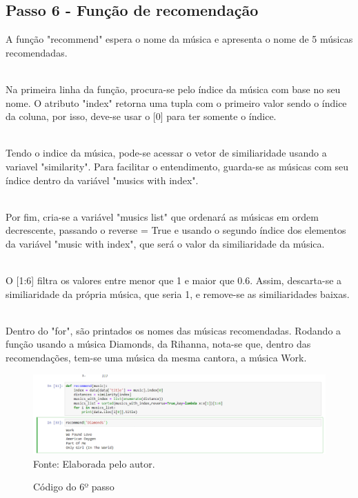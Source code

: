 \documentclass[a4paper, 12pt]{article}
\begin{document}
\subsection{Passo 6 - Função de recomendação}

A função "recommend" espera o nome da música e apresenta o nome de 5 músicas recomendadas.

\\Na primeira linha da função, procura-se pelo índice da música com base no seu nome. O atributo "index" retorna uma tupla com o primeiro valor sendo o índice da coluna, por isso, deve-se usar o [0] para ter somente o índice.

\\Tendo o indice da música, pode-se acessar o vetor de similiaridade usando a variavel "similarity". Para facilitar o entendimento,
guarda-se as músicas com seu índice dentro da variável "musics with index".

\\Por fim, cria-se a variável "musics list" que ordenará as músicas em ordem decrescente, passando o reverse = True e usando o segundo
índice dos elementos da variável "music with index", que será o valor da similiaridade da música.

\\O [1:6] filtra os valores entre menor que 1 e maior que 0.6. Assim, descarta-se a similiaridade da própria música, que seria 1, e remove-se as similiaridades baixas.

\\Dentro do "for", são printados os nomes das músicas recomendadas. Rodando a função usando a música Diamonds, da Rihanna, nota-se
que, dentro das recomendações, tem-se uma música da mesma cantora, a música Work.

 \begin{figure}[!ht]
        \centering
        \caption{Código do 6º passo}
        \includegraphics[scale=0.5]{6passo.png} \\
        {\footnotesize Fonte: Elaborada pelo autor.}
        \label{fig:my_label}
    \end{figure}
\end{document}
